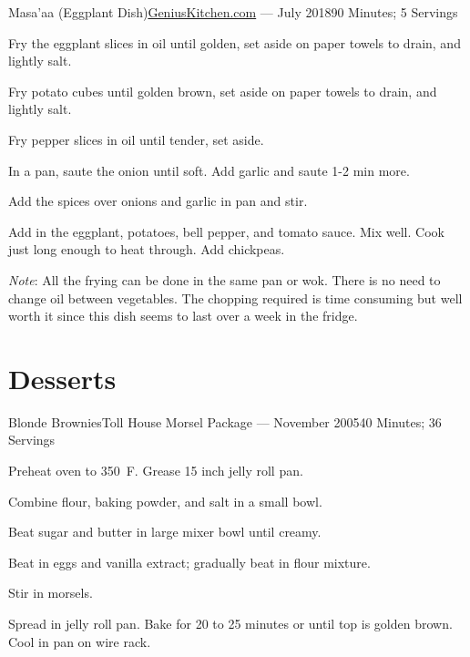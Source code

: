 \documentclass{article}
\begin{document}
\begin{recipe}{Masa'aa (Eggplant Dish)}{\href{http://www.geniuskitchen.com/recipe/egyptian-eggplant-dish-masaaa-419171}{GeniusKitchen.com} --- July 2018}{90 Minutes; 5 Servings} 

  Fry the eggplant slices in oil until golden, set aside on paper towels to
  drain, and lightly salt.

  Fry potato cubes until golden brown, set aside on paper towels to drain, and
  lightly salt.

  Fry pepper slices in oil until tender, set aside.

  In a pan, saute the onion until soft. Add garlic and saute 1-2 min more.

  Add the spices over onions and garlic in pan and stir.

  Add in the eggplant, potatoes, bell pepper, and tomato sauce. Mix well. Cook
  just long enough to heat through. Add chickpeas.

  \freeform
  \emph{Note}: All the frying can be done in the same pan or wok. There is no
  need to change oil between vegetables. The chopping required is time
  consuming but well worth it since this dish seems to last over a week in the
  fridge.

\end{recipe}

\section{Desserts}

\begin{recipe}{Blonde Brownies}{Toll House Morsel Package --- November 2005}{40 Minutes; 36 Servings}

   \newstep
   Preheat oven to 350\ \0F. Grease 15 inch jelly roll pan.

   Combine flour, baking powder, and salt in a small bowl.

   Beat sugar and butter in large mixer bowl until creamy.

   Beat in eggs and vanilla extract; gradually beat in flour mixture.

   Stir in morsels.

   \newstep
   Spread in jelly roll pan.  Bake for 20 to 25 minutes or until top is golden
   brown.  Cool in pan on wire rack.

\end{recipe}
\end{document}
